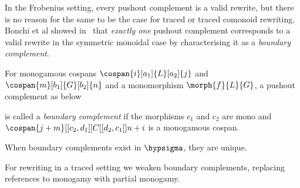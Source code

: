 In the Frobenius setting, every pushout complement is a valid rewrite, but there
is no reason for the same to be the case for traced or traced comonoid
rewriting.
Bonchi et al showed in~\cite{bonchi2022stringa} that \emph{exactly one} pushout
complement corresponds to a valid rewrite in the symmetric monoidal case by
characterising it as a \emph{boundary complement}.

\begin{definition}
    For monogamous cospans \(
    \cospan{i}[a_1]{L}[a_2]{j}
    \) and \(
    \cospan{m}[b_1]{G}[b_2]{n}
    \) and a monomorphism \(\morph{f}{L}{G}\), a pushout complement as below
    \begin{center}
    \end{center}
    is called a \emph{boundary complement} if the morphisms \(c_1\) and \(c_2\) are
    mono and \(
    \cospan{j + m}[[c_2,d_1]]{C}[[d_2,c_1]]{n + i}
    \) is a monogamous cospan.
\end{definition}

\begin{proposition}
    When boundary complements exist in \(\hypsigma\), they are unique.
\end{proposition}

For rewriting in a traced setting we weaken boundary complements, replacing
references to monogamy with partial monogamy.

